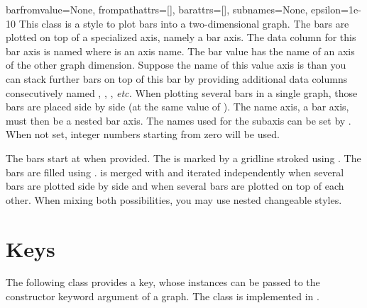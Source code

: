 \begin{classdesc}{bar}{fromvalue=None, frompathattrs=[], barattrs=[],
                       subnames=None, epsilon=1e-10}
  This class is a style to plot bars into a two-dimensional graph. The
  bars are plotted on top of a specialized axis, namely a bar axis.
  The data column for this bar axis is named  where
   is an axis name. The bar value has the name of an axis of the
  other graph dimension. Suppose the name of this value axis is
   than you can stack further bars on top of this bar by
  providing additional data columns consecutively named
  , , , \emph{etc.}
  When plotting several bars in a single graph, those bars are placed
  side by side (at the same value of ). The name axis, a
  bar axis, must then be a nested bar axis. The names used for the
  subaxis can be set by . When not set, integer numbers
  starting from zero will be used.

  The bars start at  when provided. The 
  is marked by a gridline stroked using . The bars
  are filled using .  is merged with
   and
  iterated independently when several bars are plotted side by side
  and when several bars are plotted on top of each other. When mixing
  both possibilities, you may use nested changeable styles.
\end{classdesc}

\section{Keys\label{graph:key}}


The following class provides a key, whose instances can be passed to
the constructor keyword argument  of a graph. The class is
implemented in .

